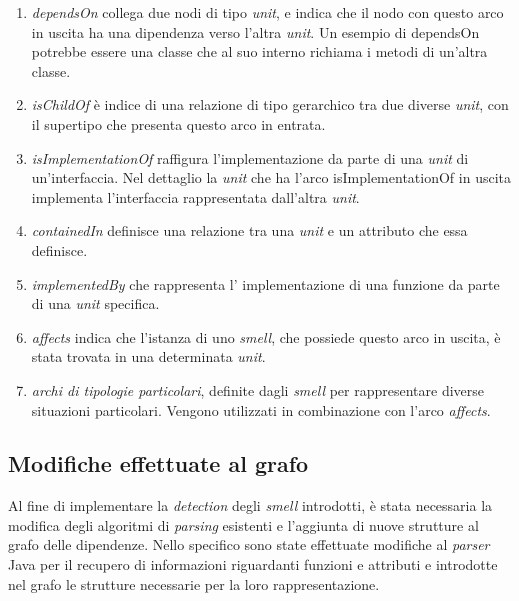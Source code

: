         \begin{enumerate}
            \item \textit{dependsOn} collega due nodi di tipo \textit{unit}, e indica che il nodo con questo arco in uscita ha una dipendenza verso l'altra \textit{unit}. Un esempio di dependsOn potrebbe essere una classe che al suo interno richiama i metodi di un'altra classe.
            
            \item \textit{isChildOf} è indice di una relazione di tipo gerarchico tra due diverse \textit{unit}, con il supertipo che presenta questo arco in entrata. %
            
            \item \textit{isImplementationOf} raffigura l'implementazione da parte di una \textit{unit} di un'interfaccia. Nel dettaglio la \textit{unit} che ha l'arco isImplementationOf in uscita implementa l'interfaccia rappresentata dall'altra \textit{unit}.
            
            \item \textit{containedIn} definisce una relazione tra una \textit{unit} e un attributo che essa definisce.
            
            \item \textit{implementedBy} che rappresenta l' implementazione di una funzione da parte di una \textit{unit} specifica. 
            
            \item \textit{affects} indica che l'istanza di uno \textit{smell}, che possiede questo arco in uscita, è stata trovata in una determinata \textit{unit}. %
            
            \item \textit{archi di tipologie particolari}, definite dagli \textit{smell} per rappresentare diverse situazioni particolari. Vengono utilizzati in combinazione con l'arco \textit{affects}.
            
        \end{enumerate}
    
    \subsection{Modifiche effettuate al grafo}
        Al fine di implementare la \textit{detection} degli \textit{smell} introdotti, è stata necessaria la modifica degli algoritmi di \textit{parsing} esistenti e l'aggiunta di nuove strutture al grafo delle dipendenze. Nello specifico sono state effettuate modifiche al \textit{parser} Java per il recupero di informazioni riguardanti funzioni e attributi e introdotte nel grafo le strutture necessarie per la loro rappresentazione.
        
